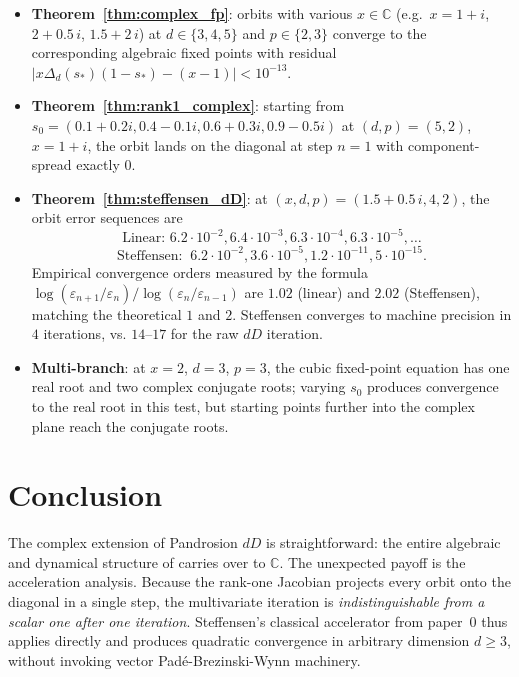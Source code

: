 \documentclass[11pt,a4paper]{article}
\theoremstyle{definition}
\theoremstyle{remark}
\newcommand{\eps}{\varepsilon}
\newcommand{\C}{\mathbb{C}}
\begin{document}
\begin{itemize}
\item \textbf{Theorem~\ref{thm:complex_fp}}: orbits with various $x \in \C$
  (e.g.~$x = 1 + i$, $2 + 0.5\, i$, $1.5 + 2\, i$) at $d \in \{3, 4, 5\}$
  and $p \in \{2, 3\}$ converge to the corresponding algebraic fixed
  points with residual $|x \Delta_d(s_*)(1-s_*) - (x-1)| < 10^{-13}$.
\item \textbf{Theorem~\ref{thm:rank1_complex}}: starting from
  $s_0 = (0.1{+}0.2i, 0.4{-}0.1i, 0.6{+}0.3i, 0.9{-}0.5i)$ at $(d, p) =
  (5, 2)$, $x = 1 + i$, the orbit lands on the diagonal at step $n = 1$
  with component-spread exactly $0$.
\item \textbf{Theorem~\ref{thm:steffensen_dD}}: at $(x, d, p) =
  (1.5 + 0.5\, i, 4, 2)$, the orbit error sequences are
  \[
    \text{Linear:    } 6.2{\cdot}10^{-2}, 6.4{\cdot}10^{-3}, 6.3{\cdot}10^{-4}, 6.3{\cdot}10^{-5}, \ldots
  \]
  \[
    \text{Steffensen:} \;\; 6.2{\cdot}10^{-2}, 3.6{\cdot}10^{-5}, 1.2{\cdot}10^{-11}, 5{\cdot}10^{-15}.
  \]
  Empirical convergence orders measured by the formula
  $\log(\eps_{n+1}/\eps_n) / \log(\eps_n/\eps_{n-1})$ are $1.02$
  (linear) and $2.02$ (Steffensen), matching the theoretical $1$ and $2$.
  Steffensen converges to machine precision in $4$ iterations, vs. $14$--$17$
  for the raw $dD$ iteration.
\item \textbf{Multi-branch}: at $x = 2$, $d = 3$, $p = 3$, the cubic
  fixed-point equation has one real root and two complex conjugate
  roots; varying $s_0$ produces convergence to the real root in this
  test, but starting points further into the complex plane reach the
  conjugate roots.
\end{itemize}

\section{Conclusion}

The complex extension of Pandrosion $dD$ is straightforward: the entire
algebraic and dynamical structure of \cite{1pandrosion_dD} carries over
to $\C$.  The unexpected payoff is the acceleration analysis.  Because
the rank-one Jacobian projects every orbit onto the diagonal in a
single step, the multivariate iteration is \emph{indistinguishable from
a scalar one after one iteration}.  Steffensen's classical accelerator
from paper~0 thus applies directly and produces quadratic convergence in
arbitrary dimension $d \geq 3$, without invoking vector
Padé-Brezinski-Wynn machinery.
\end{document}
